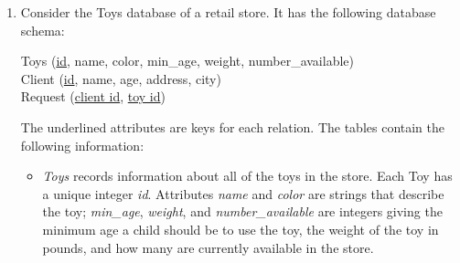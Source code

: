 \documentclass[12pt,a3paper]{article}
\newcommand{\yr}[1]{\hfill\textcolor{gray}{\small\textbf{[#1]}}}
\newcommand{\mk}[1]{\textcolor{orange!70!black}{\small\textbf{(#1 marks)}}}
\begin{document}
\begin{enumerate}
\begin{center}
\begin{tabular}{|l|l|l|l|l|l|l|l|l|l|}
\end{tabular}
\end{center}
In the above table, “Qnty” means “quantity of the item”.
Now, create a relational schema, find its functional dependencies and normalize the
schema. Write down all normalized forms up to BCNF, (1NF, 2NF, 3NF, BCNF).

 Using the schema created for the restaurant database in:
\begin{enumerate}
  \item Write a SQL query to create a view that contains the total cost of production of each food item. Cost of production for simple items depends on the total cost of ingredients (unit cost $\times$ quantity used); for packages, it depends on the total cost of the containing simple items.
  \item Using the schema and view above, find the monthly profit for each food item where profit $=$ (marketed price $-$ cost of production) $\times$ quantity sold in the month.
\end{enumerate}
\mk{20} \yr{CSE 215 | L-2/T-1 | 2022--23}

\item Consider the Toys database of a retail store. It has the following database schema:

\vspace{0.2cm}
\noindent Toys (\underline{id}, name, color, min\_age, weight, number\_available) \\
Client (\underline{id}, name, age, address, city) \\
Request (\underline{client id}, \underline{toy id})

\vspace{0.2cm}
\noindent The underlined attributes are keys for each relation. The tables contain the following information:

\begin{itemize}
    \item \textit{Toys} records information about all of the toys in the store. Each Toy has a unique integer \textit{id}. Attributes \textit{name} and \textit{color} are strings that describe the toy; \textit{min\_age}, \textit{weight}, and \textit{number\_available} are integers giving the minimum age a child should be to use the toy, the weight of the toy in pounds, and how many are currently available in the store.
    

\end{itemize}
\end{enumerate}
\end{document}
